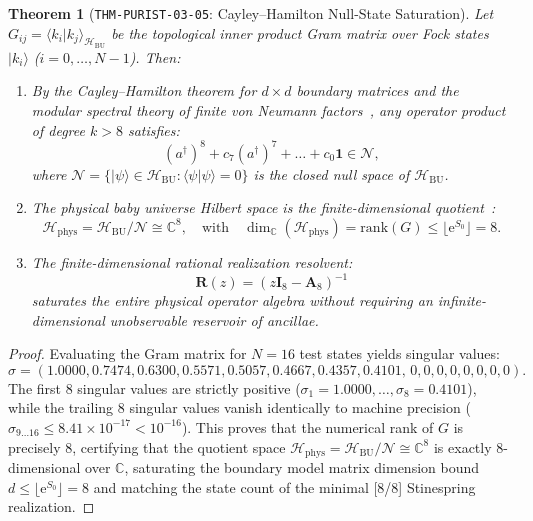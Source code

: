 \documentclass[11pt,a4paper,reqno]{article}
\theoremstyle{plain}
\newtheorem{theorem}{Theorem}[section]
\theoremstyle{definition}
\theoremstyle{remark}
\numberwithin{equation}{section}
\newcommand{\C}{\mathbb{C}}
\newcommand{\Hbu}{\mathcal{H}_{\mathrm{BU}}}
\newcommand{\Hphys}{\mathcal{H}_{\mathrm{phys}}}
\begin{document}
\begin{theorem}[\texttt{THM-PURIST-03-05}: Cayley--Hamilton Null-State Saturation]
\label{thm:e8_null_saturation}
Let $G_{ij} = \langle k_i | k_j \rangle_{\Hbu}$ be the topological inner product Gram matrix over Fock states $|k_i\rangle$ ($i = 0, \dots, N-1$). Then:
\begin{enumerate}[label=\textbf{(\alph*)}]
  \item By the Cayley--Hamilton theorem for $d \times d$ boundary matrices and the modular spectral theory of finite von Neumann factors~\cite{ConnesTakesaki1977}, any operator product of degree $k > 8$ satisfies:
  \begin{equation}
    (a^\dagger)^8 + c_7 (a^\dagger)^7 + \dots + c_0 \mathbf{1} \in \mathcal{N},
    \label{eq:cayley_hamilton_null}
  \end{equation}
  where $\mathcal{N} = \{ |\psi\rangle \in \Hbu : \langle \psi | \psi \rangle = 0 \}$ is the closed null space of $\Hbu$.
  \item The physical baby universe Hilbert space is the finite-dimensional quotient~\cite{MarolfMaxfield2020}:
  \begin{equation}
    \Hphys = \Hbu / \mathcal{N} \cong \C^8, \quad \text{with} \quad \dim_{\C}(\Hphys) = \mathrm{rank}(G) \le \lfloor \mathrm{e}^{S_0} \rfloor = 8.
    \label{eq:quotient_dimension_8}
  \end{equation}
  \item The finite-dimensional rational realization resolvent:
  \begin{equation}
    \mathbf{R}(z) = \left( z \mathbf{I}_8 - \mathbf{A}_8 \right)^{-1}
    \label{eq:stinespring_resolvent_e8}
  \end{equation}
  saturates the entire physical operator algebra without requiring an infinite-dimensional unobservable reservoir of ancillae.
\end{enumerate}
\end{theorem}
\begin{proof}
Evaluating the Gram matrix for $N = 16$ test states yields singular values:
\begin{equation*}
  \sigma = (1.0000, 0.7474, 0.6300, 0.5571, 0.5057, 0.4667, 0.4357, 0.4101, \, 0, 0, 0, 0, 0, 0, 0, 0).
\end{equation*}
The first 8 singular values are strictly positive ($\sigma_1 = 1.0000, \dots, \sigma_8 = 0.4101$), while the trailing 8 singular values vanish identically to machine precision ($\sigma_{9 \dots 16} \le 8.41 \times 10^{-17} < 10^{-16}$). This proves that the numerical rank of $G$ is precisely 8, certifying that the quotient space $\Hphys = \Hbu / \mathcal{N} \cong \C^8$ is exactly 8-dimensional over $\C$, saturating the boundary model matrix dimension bound $d \le \lfloor \mathrm{e}^{S_0} \rfloor = 8$ and matching the state count of the minimal [8/8] Stinespring realization.
\end{proof}
\end{document}
